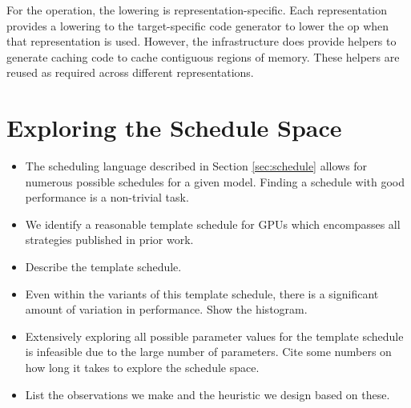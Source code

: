 For the  operation, the lowering is representation-specific. Each representation
provides a lowering to the target-specific code generator to lower the  op when
that representation is used. However, the \Treebeard{} infrastructure does provide helpers 
to generate caching code to cache contiguous regions of memory. These helpers are reused 
as required across different representations. 

\section{Exploring the Schedule Space}
\label{sec:exploring}

\begin{itemize}
  \item The scheduling language described in Section \ref{sec:schedule} allows for numerous possible schedules for a given model. 
  Finding a schedule with good performance is a non-trivial task.
  \item We identify a reasonable template schedule for GPUs which encompasses all strategies published in prior work.
  \item Describe the template schedule.
  \item Even within the variants of this template schedule, there is a significant amount of variation in performance. Show the histogram. 
  \item Extensively exploring all possible parameter values for the template schedule is infeasible due to the large number of parameters.
  Cite some numbers on how long it takes to explore the schedule space.
  \item List the observations we make and the heuristic we design based on these.
\end{itemize}

